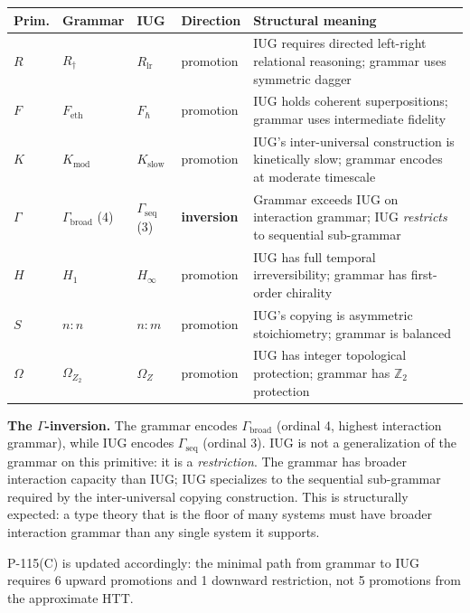\documentclass[10pt,a4paper]{article}
\begin{document}
\begin{table}[htbp]
\centering
\small
{}
\begin{tabularx}{\textwidth}{>{\centering\arraybackslash}X >{\centering\arraybackslash}X >{\centering\arraybackslash}X >{\centering\arraybackslash}X >{\centering\arraybackslash}X}
\toprule
\rowcolor{gray!25}\textbf{Prim.} & \textbf{Grammar} & \textbf{IUG} & \textbf{Direction} & \textbf{Structural meaning} \\
\midrule
\rowcolors{1}{white}{gray!10}
$R$ & $R_{\dagger}$ & $R_\text{lr}$ & promotion & IUG requires directed left-right relational reasoning; grammar uses symmetric dagger \\
$F$ & $F_\text{eth}$ & $F_{\hbar}$ & promotion & IUG holds coherent superpositions; grammar uses intermediate fidelity \\
$K$ & $K_\text{mod}$ & $K_\text{slow}$ & promotion & IUG's inter-universal construction is kinetically slow; grammar encodes at moderate timescale \\
$\Gamma$ & $\Gamma_\text{broad}$ (4) & $\Gamma_\text{seq}$ (3) & \textbf{inversion} & Grammar exceeds IUG on interaction grammar; IUG \emph{restricts} to sequential sub-grammar \\
$H$ & $H_1$ & $H_{\infty}$ & promotion & IUG has full temporal irreversibility; grammar has first-order chirality \\
$S$ & $n{:}n$ & $n{:}m$ & promotion & IUG's copying is asymmetric stoichiometry; grammar is balanced \\
$\Omega$ & $\Omega_{Z_2}$ & $\Omega_Z$ & promotion & IUG has integer topological protection; grammar has $\mathbb{Z}_2$ protection \\
\bottomrule
\end{tabularx}
\end{table}

\textbf{The $\Gamma$-inversion.} The grammar encodes $\Gamma_\text{broad}$ (ordinal 4, highest interaction
grammar), while IUG encodes $\Gamma_\text{seq}$ (ordinal 3). IUG is not a generalization of the
grammar on this primitive: it is a \emph{restriction}. The grammar has broader interaction capacity
than IUG; IUG specializes to the sequential sub-grammar required by the inter-universal copying
construction. This is structurally expected: a type theory that is the floor of many systems
must have broader interaction grammar than any single system it supports.

P-115(C) is updated accordingly: the minimal path from grammar to IUG requires 6 upward
promotions and 1 downward restriction, not 5 promotions from the approximate HTT.
\end{document}
